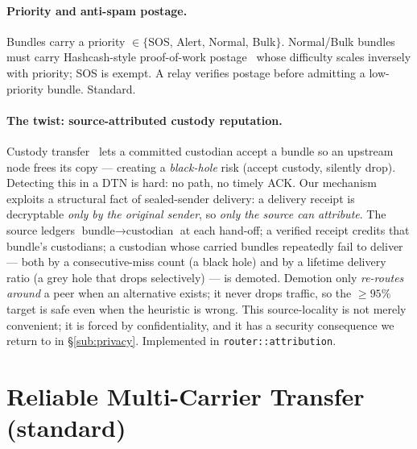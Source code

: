 \documentclass[11pt]{article}
\begin{document}
\paragraph{Priority and anti-spam postage.} Bundles carry a priority
$\in\{$SOS, Alert, Normal, Bulk$\}$. Normal/Bulk bundles must carry Hashcash-style
proof-of-work postage~\cite{back2002hashcash} whose difficulty scales inversely
with priority; SOS is exempt. A relay verifies postage before admitting a
low-priority bundle. Standard.

\paragraph{The twist: source-attributed custody reputation.}\label{par:custody}
Custody transfer~\cite{rfc5050} lets a committed custodian accept a bundle so an
upstream node frees its copy --- creating a \emph{black-hole} risk (accept
custody, silently drop). Detecting this in a DTN is hard: no path, no timely ACK.
Our mechanism exploits a structural fact of sealed-sender delivery: a delivery
receipt is decryptable \emph{only by the original sender}, so \emph{only the
source can attribute}. The source ledgers $\text{bundle}\!\rightarrow\!
\text{custodian}$ at each hand-off; a verified receipt credits that bundle's
custodians; a custodian whose carried bundles repeatedly fail to deliver --- both
by a consecutive-miss count (a black hole) and by a lifetime delivery ratio (a
grey hole that drops selectively) --- is demoted. Demotion only \emph{re-routes
around} a peer when an alternative exists; it never drops traffic, so the
$\geq 95\%$ target is safe even when the heuristic is wrong. This source-locality
is not merely convenient; it is forced by confidentiality, and it has a security
consequence we return to in \S\ref{sub:privacy}. Implemented in
\texttt{router::attribution}.

\section{Reliable Multi-Carrier Transfer (standard)}\label{sec:swarm}
\end{document}
